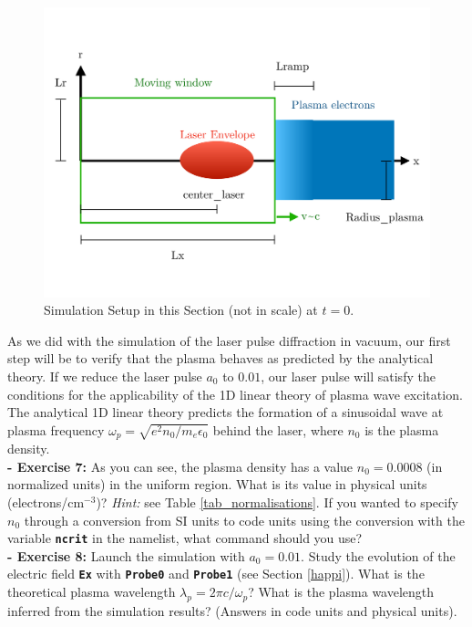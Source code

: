 \documentclass{article}
\newcommand{\commandline}[1]{\texttt{\textbf{#1}}}
\begin{document}
\begin{figure}[h!]
  \begin{center}
  \includegraphics[scale=0.3]{Schema_Simulation_2.pdf}
  \end{center}
  \caption{Simulation Setup in this Section (not in scale) at $t=0$.}
  \label{Schema2}
\end{figure}

As we did with the simulation of the laser pulse diffraction in vacuum, our first step will be to verify that the plasma behaves as predicted by the analytical theory. If we reduce the laser pulse $a_0$ to $0.01$, our laser pulse will satisfy the conditions for the applicability of the 1D linear theory of plasma wave excitation. The  analytical 1D linear theory predicts the formation of a sinusoidal wave at plasma frequency $\omega_p=\sqrt{e^2n_0/m_e\epsilon_0}$ behind the laser, where $n_0$ is the plasma density.\\

\textbf{ - Exercise 7:} As you can see, the plasma density has a value $n_0=0.0008$ (in normalized units) in the uniform region.  What is its value in physical units (electrons/cm$^{-3}$)? \textit{Hint:} see Table \ref{tab_normalisations}. If you wanted to specify $n_0$ through a conversion from SI units to code units using the conversion with the variable \commandline{ncrit} in the namelist, what command should you use? \\

\textbf{ - Exercise 8:} Launch the simulation with $a_0=0.01$. Study the evolution of the electric field \commandline{Ex} with \commandline{Probe0} and \commandline{Probe1} (see Section \ref{happi}). What is the theoretical plasma wavelength $\lambda_p=2\pi c/\omega_p$? What is the plasma wavelength inferred from the simulation results? (Answers in code units and physical units).\\
\end{document}
